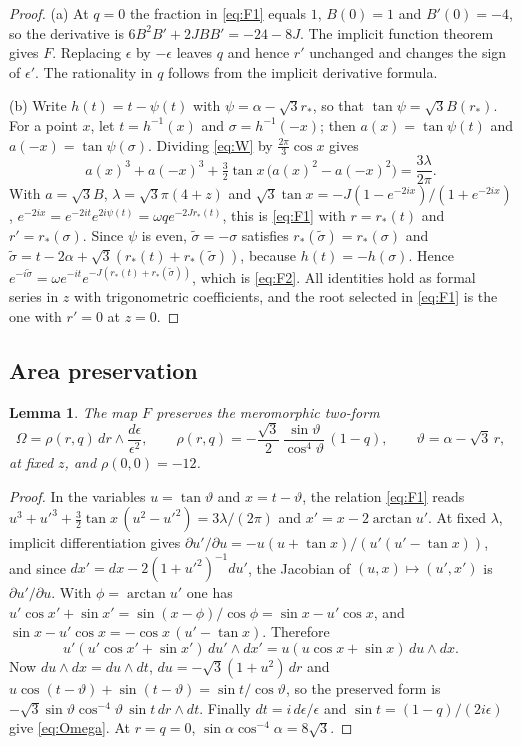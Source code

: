 \documentclass[11pt]{amsart}
\numberwithin{equation}{section}
\newtheorem{lemma}[theorem]{Lemma}
\theoremstyle{definition}
\theoremstyle{remark}
\begin{document}
\begin{proof}
(a) At $q=0$ the fraction in \eqref{eq:F1} equals $1$, $B(0)=1$ and $B'(0)=-4$, so the derivative is $6B^2B'+2JBB'=-24-8J$. The implicit function theorem gives $F$. Replacing $\epsilon$ by $-\epsilon$ leaves $q$ and hence $r'$ unchanged and changes the sign of $\epsilon'$. The rationality in $q$ follows from the implicit derivative formula.

(b) Write $h(t)=t-\psi(t)$ with $\psi=\alpha-\sqrt3r_*$, so that $\tan\psi=\sqrt3B(r_*)$. For a point $x$, let $t=h^{-1}(x)$ and $\sigma=h^{-1}(-x)$; then $a(x)=\tan\psi(t)$ and $a(-x)=\tan\psi(\sigma)$. Dividing \eqref{eq:W} by $\frac{2\pi}3\cos x$ gives
\[
a(x)^3+a(-x)^3+\tfrac32\tan x\,\bigl(a(x)^2-a(-x)^2\bigr)=\frac{3\lambda}{2\pi}.
\]
With $a=\sqrt3B$, $\lambda=\sqrt3\pi(4+z)$ and $\sqrt3\tan x=-J(1-e^{-2ix})/(1+e^{-2ix})$, $e^{-2ix}=e^{-2it}e^{2i\psi(t)}=\omega qe^{-2Jr_*(t)}$, this is \eqref{eq:F1} with $r=r_*(t)$ and $r'=r_*(\sigma)$. Since $\psi$ is even, $\tilde\sigma=-\sigma$ satisfies $r_*(\tilde\sigma)=r_*(\sigma)$ and $\tilde\sigma=t-2\alpha+\sqrt3(r_*(t)+r_*(\tilde\sigma))$, because $h(t)=-h(\sigma)$. Hence $e^{-i\tilde\sigma}=\omega e^{-it}e^{-J(r_*(t)+r_*(\tilde\sigma))}$, which is \eqref{eq:F2}. All identities hold as formal series in $z$ with trigonometric coefficients, and the root selected in \eqref{eq:F1} is the one with $r'=0$ at $z=0$.
\end{proof}

\subsection{Area preservation}

\begin{lemma}\label{lem:area}
The map $F$ preserves the meromorphic two-form
\begin{equation}\label{eq:Omega}
\Omega=\rho(r,q)\,dr\wedge\frac{d\epsilon}{\epsilon^2},\qquad \rho(r,q)=-\frac{\sqrt3}2\,\frac{\sin\vartheta}{\cos^4\vartheta}\,(1-q),\qquad \vartheta=\alpha-\sqrt3\,r,
\end{equation}
at fixed $z$, and $\rho(0,0)=-12$.
\end{lemma}

\begin{proof}
In the variables $u=\tan\vartheta$ and $x=t-\vartheta$, the relation \eqref{eq:F1} reads $u^3+u'^3+\frac32\tan x\,(u^2-u'^2)=3\lambda/(2\pi)$ and $x'=x-2\arctan u'$. At fixed $\lambda$, implicit differentiation gives $\partial u'/\partial u=-u(u+\tan x)/(u'(u'-\tan x))$, and since $dx'=dx-2(1+u'^2)^{-1}du'$, the Jacobian of $(u,x)\mapsto(u',x')$ is $\partial u'/\partial u$. With $\phi=\arctan u'$ one has $u'\cos x'+\sin x'=\sin(x-\phi)/\cos\phi=\sin x-u'\cos x$, and $\sin x-u'\cos x=-\cos x\,(u'-\tan x)$. Therefore
\[
u'(u'\cos x'+\sin x')\,du'\wedge dx'=u(u\cos x+\sin x)\,du\wedge dx .
\]
Now $du\wedge dx=du\wedge dt$, $du=-\sqrt3(1+u^2)\,dr$ and $u\cos(t-\vartheta)+\sin(t-\vartheta)=\sin t/\cos\vartheta$, so the preserved form is $-\sqrt3\sin\vartheta\cos^{-4}\vartheta\,\sin t\,dr\wedge dt$. Finally $dt=i\,d\epsilon/\epsilon$ and $\sin t=(1-q)/(2i\epsilon)$ give \eqref{eq:Omega}. At $r=q=0$, $\sin\alpha\cos^{-4}\alpha=8\sqrt3$.
\end{proof}
\end{document}

